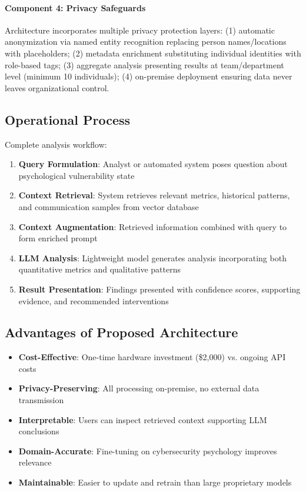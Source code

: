 \documentclass[11pt, a4paper]{article}
\begin{document}
\paragraph{Component 4: Privacy Safeguards}
Architecture incorporates multiple privacy protection layers: (1) automatic anonymization via named entity recognition replacing person names/locations with placeholders; (2) metadata enrichment substituting individual identities with role-based tags; (3) aggregate analysis presenting results at team/department level (minimum 10 individuals); (4) on-premise deployment ensuring data never leaves organizational control.

\subsection{Operational Process}

Complete analysis workflow:
\begin{enumerate}
\item \textbf{Query Formulation}: Analyst or automated system poses question about psychological vulnerability state
\item \textbf{Context Retrieval}: System retrieves relevant metrics, historical patterns, and communication samples from vector database
\item \textbf{Context Augmentation}: Retrieved information combined with query to form enriched prompt
\item \textbf{LLM Analysis}: Lightweight model generates analysis incorporating both quantitative metrics and qualitative patterns
\item \textbf{Result Presentation}: Findings presented with confidence scores, supporting evidence, and recommended interventions
\end{enumerate}

\subsection{Advantages of Proposed Architecture}

\begin{itemize}
\item \textbf{Cost-Effective}: One-time hardware investment (\$2,000) vs. ongoing API costs
\item \textbf{Privacy-Preserving}: All processing on-premise, no external data transmission
\item \textbf{Interpretable}: Users can inspect retrieved context supporting LLM conclusions
\item \textbf{Domain-Accurate}: Fine-tuning on cybersecurity psychology improves relevance
\item \textbf{Maintainable}: Easier to update and retrain than large proprietary models
\end{itemize}
\end{document}
